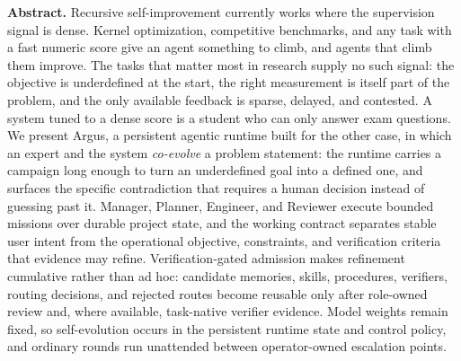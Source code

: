 \documentclass[10pt,letterpaper]{article}
\newcommand{\systemname}{Argus\xspace}
\begin{document}
\begin{abstractbox}
\small
\textbf{Abstract.}
Recursive self-improvement currently works where the supervision signal is dense.
Kernel optimization, competitive benchmarks, and any task with a fast numeric score
give an agent something to climb, and agents that climb them improve. The tasks that
matter most in research supply no such signal: the objective is underdefined at the
start, the right measurement is itself part of the problem, and the only available
feedback is sparse, delayed, and contested. A system tuned to a dense score is a
student who can only answer exam questions. We present \systemname, a persistent
agentic runtime built for the other case, in which an expert and the system
\emph{co-evolve} a problem statement: the runtime carries a campaign long enough to
turn an underdefined goal into a defined one, and surfaces the specific contradiction
that requires a human decision instead of guessing past it. Manager, Planner,
Engineer, and Reviewer execute bounded missions over durable project state, and the
working contract separates stable user intent from the operational objective,
constraints, and verification criteria that evidence may refine. Verification-gated
admission makes refinement cumulative rather than ad hoc: candidate memories, skills,
procedures, verifiers, routing decisions, and rejected routes become reusable only
after role-owned review and, where available, task-native verifier evidence. Model
weights remain fixed, so self-evolution occurs in the persistent runtime state and
control policy, and ordinary rounds run unattended between operator-owned escalation
points.


\end{abstractbox}
\end{document}
